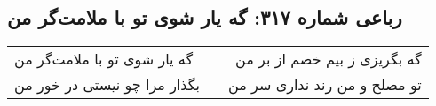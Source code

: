 \begin{center}
\section*{رباعی شماره ۳۱۷: گه یار شوی تو با ملامت‌گر من}
\label{sec:sh317}
\begin{longtable}{l p{0.5cm} r}
گه یار شوی تو با ملامت‌گر من
&&
گه بگریزی ز بیم خصم از بر من
\\
بگذار مرا چو نیستی در خور من
&&
تو مصلح و من رند نداری سر من
\\
\end{longtable}
\end{center}
